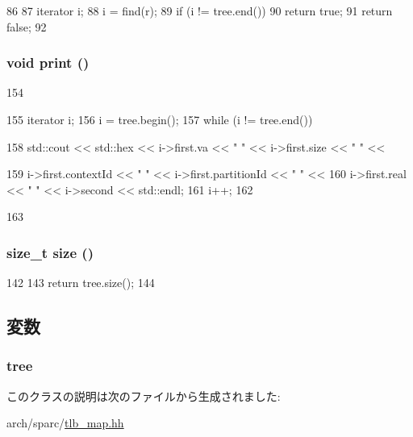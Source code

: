 \begin{DoxyCode}
86     {
87         iterator i;
88         i = find(r);
89         if (i != tree.end())
90             return true;
91         return false;
92     }
\end{DoxyCode}
\hypertarget{classSparcISA_1_1TlbMap_a388f572c62279f839ee138a9afbdeeb5}{
\subsubsection[{print}]{\setlength{\rightskip}{0pt plus 5cm}void print ()}}
\label{classSparcISA_1_1TlbMap_a388f572c62279f839ee138a9afbdeeb5}



\begin{DoxyCode}
154     {
155         iterator i;
156         i = tree.begin();
157         while (i != tree.end()) {
158            std::cout << std::hex << i->first.va << " " << i->first.size << " " <<
      
159                 i->first.contextId << " " << i->first.partitionId << " " <<
160                 i->first.real << " " << i->second << std::endl;
161             i++;
162         }
163     }
\end{DoxyCode}
\hypertarget{classSparcISA_1_1TlbMap_a0b6b70701c46e22849f0f363861351cd}{
\subsubsection[{size}]{\setlength{\rightskip}{0pt plus 5cm}size\_\-t size ()}}
\label{classSparcISA_1_1TlbMap_a0b6b70701c46e22849f0f363861351cd}



\begin{DoxyCode}
142     {
143         return tree.size();
144     }
\end{DoxyCode}


\subsection{変数}
\hypertarget{classSparcISA_1_1TlbMap_a3a72c569864f92e88af53d780f71ceac}{
\subsubsection[{tree}]{ {\bf tree}}}
\label{classSparcISA_1_1TlbMap_a3a72c569864f92e88af53d780f71ceac}


このクラスの説明は次のファイルから生成されました:\begin{DoxyCompactItemize}
\item 
arch/sparc/\hyperlink{tlb__map_8hh}{tlb\_\-map.hh}\end{DoxyCompactItemize}
